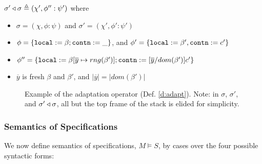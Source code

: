 \begin{definition}
\label{d:adapt}
$\sigma' \triangleleft \sigma \triangleq (\chi', \phi'' : \psi')$
where 
\begin{itemize}
\item
$\sigma = (\chi, \phi : \psi)$ 
and
$\sigma' = (\chi', \phi' : \psi')$
\item
$\phi = \{{\texttt{local}}:=\beta; {\texttt{contn}}:=\_\}$, and
$\phi' = \{{\texttt{local}}:=\beta', {\texttt{contn}}:=c'\}$
\item
$\phi'' = \{{\texttt{local}}:=\beta[\overline{y} \mapsto rng(\beta')]; {\texttt{contn}}:=[\overline{y}/dom(\beta')]c'\}$
\item
$\overline{y}$ is fresh $\beta$ and $\beta'$, and $|\overline{y}| = |dom(\beta')|$
\end{itemize}
\end{definition}

\begin{figure}[htb]

   \caption{Example of the adaptation operator
     (Def. \ref{d:adapt}). %
     Note: in $\sigma$, $\sigma'$, and $\sigma' \triangleleft \sigma$, all but the top frame of the stack is elided for simplicity.
    }
   \label{fig:adaptation}
 \end{figure}
 

\subsubsection{Semantics of \Nec Specifications}


We   now define  semantics of specifications,  $M \vDash S$, 
by cases over the four possible syntactic forms: 


